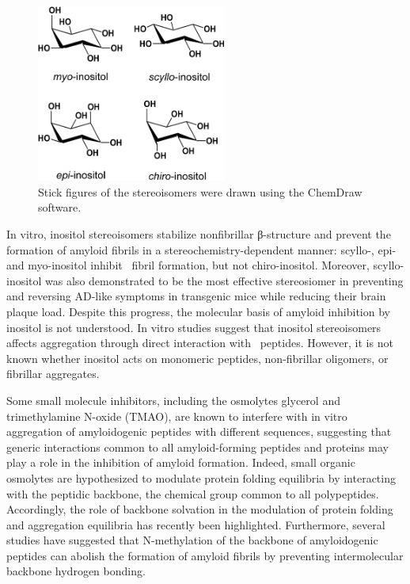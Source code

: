 \begin{figure}[hb]
  \centering
  \includegraphics[width=235px]{figures/results1/GA4_paper_figures_submitted-1}
  \caption[Inositol stereoisomers most commonly found in nature.]
   {Stick figures of the stereoisomers were drawn using the ChemDraw software.}
   \label{fig:figure1}
\end{figure}

In vitro, inositol stereoisomers stabilize nonfibrillar β-structure and prevent the formation of amyloid fibrils in a stereochemistry-dependent manner: scyllo-, epi- and myo-inositol inhibit \abeta\ fibril formation, but not chiro-inositol.\cite{McLaurin:2000p64,McLaurin:1998p176,Nitz:2008p13,Sun:2008p12,Townsend:2006p44} Moreover, scyllo-inositol was also demonstrated to be the most effective stereosiomer in preventing and reversing AD-like symptoms in transgenic mice while reducing their brain plaque load.\cite{McLaurin:2006p29} Despite this progress, the molecular basis of amyloid inhibition by inositol is not understood. In vitro studies suggest that inositol stereoisomers affects aggregation through direct interaction with \abeta\ peptides.\cite{McLaurin:1998p176,McLaurin:2000p64,Nitz:2008p13,Sun:2008p12} However, it is not known whether inositol acts on monomeric peptides, non-fibrillar oligomers, or fibrillar aggregates.

Some small molecule inhibitors, including the osmolytes glycerol and trimethylamine N-oxide (TMAO), are known to interfere with in vitro aggregation of amyloidogenic peptides with different sequences,\cite{Scaramozzino:2006p69,Yang:1999p77,McLaurin:2000p76,Ehrnhoefer:2008p8,Dasilva:2010p25,Bieschke:2010p32} suggesting that generic interactions common to all amyloid-forming peptides and proteins may play a role in the inhibition of amyloid formation. Indeed, small organic osmolytes are hypothesized to modulate protein folding equilibria by interacting with the peptidic backbone, the chemical group common to all polypeptides.\cite{Street:2006p21,Hu:2010p46,Auton:2008p28} Accordingly, the role of backbone solvation in the modulation of protein folding\cite{Rose:2006p35,Auton:2008p28} and aggregation equilibria has recently been highlighted.\cite{Rauscher:2006p43} Furthermore, several studies have suggested that N-methylation of the backbone of amyloidogenic peptides can abolish the formation of amyloid fibrils by preventing intermolecular backbone hydrogen bonding.\cite{Takeda:2010p52,Soto:2007p171}

